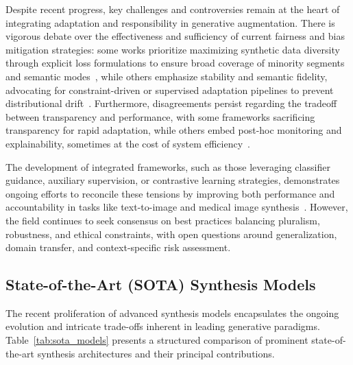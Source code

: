 \documentclass[sigconf]{acmart}
\begin{document}
Despite recent progress, key challenges and controversies remain at the heart of integrating adaptation and responsibility in generative augmentation. There is vigorous debate over the effectiveness and sufficiency of current fairness and bias mitigation strategies: some works prioritize maximizing synthetic data diversity through explicit loss formulations to ensure broad coverage of minority segments and semantic modes~\cite{ref93}, while others emphasize stability and semantic fidelity, advocating for constraint-driven or supervised adaptation pipelines to prevent distributional drift~\cite{ref91,ref95}. Furthermore, disagreements persist regarding the tradeoff between transparency and performance, with some frameworks sacrificing transparency for rapid adaptation, while others embed post-hoc monitoring and explainability, sometimes at the cost of system efficiency~\cite{ref94,ref101}. 

The development of integrated frameworks, such as those leveraging classifier guidance, auxiliary supervision, or contrastive learning strategies, demonstrates ongoing efforts to reconcile these tensions by improving both performance and accountability in tasks like text-to-image and medical image synthesis~\cite{ref91,ref94,ref95,ref101}. However, the field continues to seek consensus on best practices balancing pluralism, robustness, and ethical constraints, with open questions around generalization, domain transfer, and context-specific risk assessment.

\subsection{State-of-the-Art (SOTA) Synthesis Models}

The recent proliferation of advanced synthesis models encapsulates the ongoing evolution and intricate trade-offs inherent in leading generative paradigms. Table~\ref{tab:sota_models} presents a structured comparison of prominent state-of-the-art synthesis architectures and their principal contributions.
\end{document}
